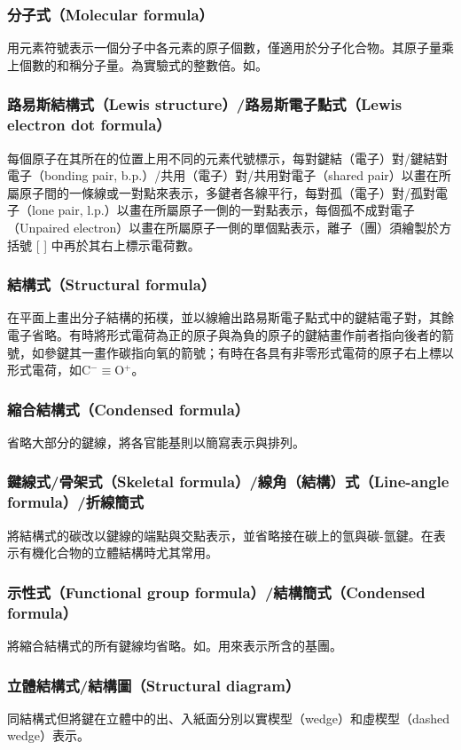 \documentclass[a4paper,12pt]{article}
\begin{document}
\subsubsection{分子式（Molecular formula）}
用元素符號表示一個分子中各元素的原子個數，僅適用於分子化合物。其原子量乘上個數的和稱分子量。為實驗式的整數倍。如。
\subsubsection{路易斯結構式（Lewis structure）/路易斯電子點式（Lewis electron dot formula）}
每個原子在其所在的位置上用不同的元素代號標示，每對鍵結（電子）對/鍵結對電子（bonding pair, b.p.）/共用（電子）對/共用對電子（shared pair）以畫在所屬原子間的一條線或一對點來表示，多鍵者各線平行，每對孤（電子）對/孤對電子（lone pair, l.p.）以畫在所屬原子一側的一對點表示，每個孤不成對電子（Unpaired electron）以畫在所屬原子一側的單個點表示，離子（團）須繪製於方括號 [ ] 中再於其右上標示電荷數。
\subsubsection{結構式（Structural formula）}
在平面上畫出分子結構的拓樸，並以線繪出路易斯電子點式中的鍵結電子對，其餘電子省略。有時將形式電荷為正的原子與為負的原子的鍵結畫作前者指向後者的箭號，如參鍵其一畫作碳指向氧的箭號；有時在各具有非零形式電荷的原子右上標以形式電荷，如C$^-\equiv$O$^+$。
\subsubsection{縮合結構式（Condensed formula）}
省略大部分的鍵線，將各官能基則以簡寫表示與排列。
\subsubsection{鍵線式/骨架式（Skeletal formula）/線角（結構）式（Line-angle formula）/折線簡式}
將結構式的碳改以鍵線的端點與交點表示，並省略接在碳上的氫與碳-氫鍵。在表示有機化合物的立體結構時尤其常用。
\subsubsection{示性式（Functional group formula）/結構簡式（Condensed formula）}
將縮合結構式的所有鍵線均省略。如。用來表示所含的基團。
\subsubsection{立體結構式/結構圖（Structural diagram）}
同結構式但將鍵在立體中的出、入紙面分別以實楔型（wedge）和虛楔型（dashed wedge）表示。
\end{document}
